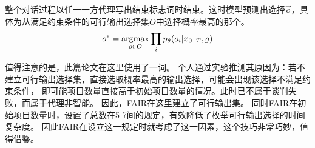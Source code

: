 整个对话过程以任一一方代理写出结束标志词时结束。这时模型预测出选择$\vec{o}$，具体为从满足约束条件的可行输出选择集$O$中选择概率最高的那个。
\begin{equation}
\label{equation:output}
o^{*} = \operatorname*{\arg\!\max}_{o\in O} \prod_{i} p_\theta(o_i | x_{0.. T}, g)
\end{equation}

值得注意的是，此篇论文在这里使用了一词。
个人通过实验推测其原因为：若不建立可行输出选择集，直接选取概率最高的输出选择，可能会出现该选择不满足约束条件，
即可能项目数量直接高于初始项目数量的情况。此时已不属于谈判失败，而属于代理非智能。
因此，FAIR在这里建立了可行输出集。
同时FAIR在初始项目数量时，设置了总数在5-7间的规定，有效降低了枚举可行输出选择的时间复杂度。
因此FAIR在设立这一规定时就考虑了这一因素，这个技巧非常巧妙，值得借鉴。